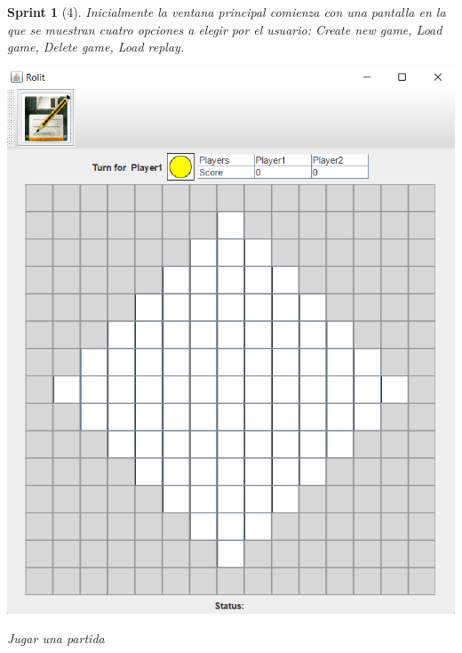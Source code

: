 \documentclass{article}
\theoremstyle{break}
\newtheorem*{sprint}{Sprint}
\begin{document}
\begin{sprint}[4]
Inicialmente la ventana principal comienza con una pantalla en la que se muestran cuatro opciones a elegir por el usuario: \textit{Create new game, Load game, Delete game, Load replay}.

\begin{center}
\includegraphics[scale=0.9]{game-sprint3.png}

Jugar una partida
\end{center}


\end{sprint}
\end{document}
